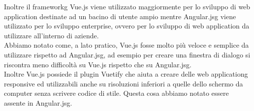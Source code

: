 Inoltre il \gls{frameworkg} Vue.js viene utilizzato maggiormente per lo sviluppo di web application destinate ad un bacino di utente ampio mentre \gls{Angular.jsg} viene utilizzato per lo sviluppo enterprise, ovvero per lo sviluppo di web application da utilizzare all'interno di aziende.\\
Abbiamo notato come, a lato pratico, Vue.js fosse molto più veloce e semplice da utilizzare rispetto ad \gls{Angular.jsg}, ad esempio per creare una finestra di dialogo si riscontra meno difficoltà su Vue.js rispetto che su \gls{Angular.jsg}.\\
Inoltre Vue.js possiede il plugin Vuetify che aiuta a creare delle \gls{web applicationg} responsive ed utilizzabili anche su risoluzioni inferiori a quelle dello schermo da computer senza scrivere codice di stile. Questa cosa abbiamo notato essere assente in \gls{Angular.jsg}.



